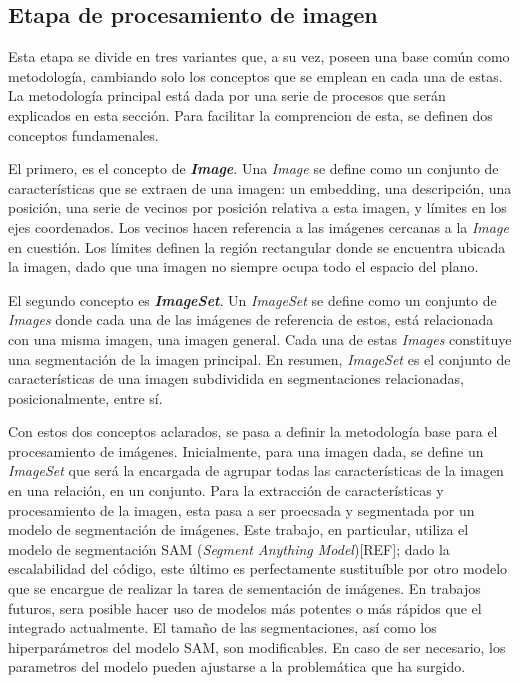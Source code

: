 \subsection*{Etapa de procesamiento de imagen}
Esta etapa se divide en tres variantes que, a su vez, poseen una base común como metodología, cambiando solo los conceptos que se emplean en cada una de estas. La metodología principal está dada por una serie de procesos que serán explicados en esta sección. Para facilitar la comprencion de esta, se definen dos conceptos fundamenales.

El primero, es el concepto de \textbf{\textit{Image}}. Una \textit{Image} se define como un conjunto de características que se extraen de una imagen: un embedding, una descripción, una posición, una serie de vecinos por posición relativa a esta imagen, y límites en los ejes coordenados. Los vecinos hacen referencia a las imágenes cercanas a la \textit{Image} en cuestión. Los límites definen la región rectangular donde se encuentra ubicada la imagen, dado que una imagen no siempre ocupa todo el espacio del plano.

El segundo concepto es \textbf{\textit{ImageSet}}. Un \textit{ImageSet} se define como un conjunto de \textit{Images} donde cada una de las imágenes de referencia de estos, está relacionada con una misma imagen, una imagen general. Cada una de estas \textit{Images} constituye una segmentación de la imagen principal. En resumen, \textit{ImageSet} es el conjunto de características de una imagen subdividida en segmentaciones relacionadas, posicionalmente, entre s\'i. 

Con estos dos conceptos aclarados, se pasa a definir la metodología base para el procesamiento de imágenes. Inicialmente, para una imagen dada, se define un \textit{ImageSet} que será la encargada de agrupar todas las características de la imagen en una relación, en un conjunto. Para la extracción de características y procesamiento de la imagen, esta pasa a ser proecsada y segmentada por un modelo de segmentaci\'on de im\'agenes. Este trabajo, en particular, utiliza el modelo de segmentación SAM (\textit{Segment Anything Model})[REF]; dado la escalabilidad del código, este \'ultimo es perfectamente sustituíble por otro modelo que se encargue de realizar la tarea de sementaci\'on de imágenes. En trabajos futuros, sera posible hacer uso de modelos más potentes o más rápidos que el integrado actualmente. El tamaño de las segmentaciones, así como los hiperparámetros del modelo SAM, son modificables. En caso de ser necesario, los parametros del modelo pueden ajustarse a la problem\'atica que ha surgido.

